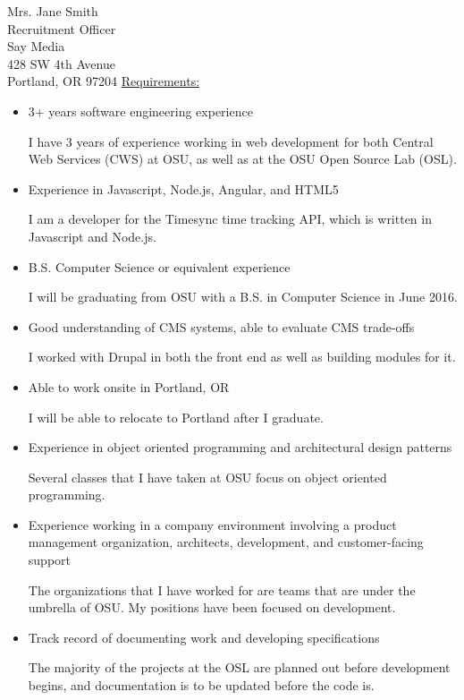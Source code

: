 \documentclass[11pt]{letter} %
\begin{document}
\begin{letter}{Mrs. Jane Smith \\
Recruitment Officer \\
Say Media \\
428 SW 4th Avenue \\
Portland, OR 97204}
\underline{Requirements:}

\begin{itemize}
  \item 3+ years software engineering experience

        I have 3 years of experience working in web development for both Central
        Web Services (CWS) at OSU, as well as at the OSU Open Source Lab (OSL).

  \item Experience in Javascript, Node.js, Angular, and HTML5

        I am a developer for the Timesync time tracking API, which is written in
        Javascript and Node.js.

  \item B.S. Computer Science or equivalent experience

        I will be graduating from OSU with a B.S. in Computer Science in June
        2016.

  \item Good understanding of CMS systems, able to evaluate CMS trade-offs

        I worked with Drupal in both the front end as well as building modules
        for it.

  \item Able to work onsite in Portland, OR

        I will be able to relocate to Portland after I graduate.

  \item Experience in object oriented programming and architectural design
    patterns

        Several classes that I have taken at OSU focus on object oriented
        programming.

  \item Experience working in a company environment involving a product
    management organization, architects, development, and customer-facing
    support

        The organizations that I have worked for are teams that are under the
        umbrella of OSU. My positions have been focused on development.   

  \item Track record of documenting work and developing specifications

        The majority of the projects at the OSL are planned out before
        development begins, and documentation is to be updated before the code
        is.


\end{itemize}
\end{letter}
\end{document}
